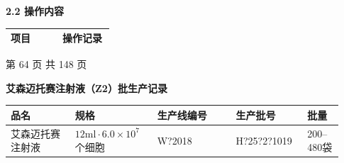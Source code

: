 \documentclass[UTF8,10pt,a4paper,fontset=fandol]{ctexart}
\newcommand{\fieldvalue}[1]{#1}
\newcommand{\handwritten}[1]{#1}
\begin{document}
\medskip
\textbf{2.2 操作内容}

\begin{tabular}{|p{0.48\linewidth}|p{0.48\linewidth}|}
\hline
项目 & 操作记录\\
\hline
\end{tabular}

\begin{center}
第 64 页 共 148 页
\end{center}

\newpage

\begin{center}
\textbf{艾森迈托赛注射液（Z2）批生产记录}
\end{center}

\begin{tabular}{|p{0.18\linewidth}|p{0.23\linewidth}|p{0.22\linewidth}|p{0.20\linewidth}|p{0.10\linewidth}|}
\hline
品名 & 规格 & 生产线编号 & 生产批号 & 批量 \\ \hline
艾森迈托赛注射液 & $12\mathrm{ml}\cdot 6.0\times10^{7}$个细胞 &
\fieldvalue{\handwritten{W?2018}} &
\fieldvalue{\handwritten{H?25?2?1019}} &
200--480袋 \\ \hline
\end{tabular}

\vspace{0.3em}
\end{document}
